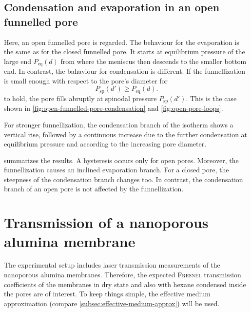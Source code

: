 \documentclass[../thesis.tex]{subfiles}
\begin{document}
      \subsection{Condensation and evaporation in an open funnelled pore}
      \label{subsec:open-funnelled-pore-theory}

        Here, an open funnelled pore is regarded. The behaviour for the evaporation is the same as for the closed funnelled pore. It starts at equilibrium pressure of the large end $P_\mathrm{eq}(d)$ from where the meniscus then descends to the smaller bottom end. In contrast, the bahaviour for condensation is different. If the funnellization is small enough with respect to the pore's diameter for
        \begin{equation*}
            P_\mathrm{sp}(d')\ge P_\mathrm{eq}(d).
            \label{eq:open-fun-pore-precond}
        \end{equation*}
        to hold, the pore fills abruptly at spinodal pressure $P_\mathrm{sp}(d')$. This is the case shown in \cref{fig:open-funnelled-pore-condensation} and \cref{fig:open-pore-loops}.

        For stronger funnellization, the condensation branch of the isotherm shows a vertical rise, followed by a continuous increase due to the further condensation at equilibrium pressure and according to the increasing pore diameter.
        \medskip

         summarizes the results. A hysteresis occurs only for open pores. Moreover, the funnellization causes an inclined evaporation branch. For a closed pore, the steepness of the condensation branch changes too. In contrast, the condensation branch of an open pore is not affected by the funnellization.

        


    \section{Transmission of a nanoporous alumina membrane}

      The experimental setup includes laser transmission measurements of the nanoporous alumina membranes. Therefore, the expected \textsc{Fresnel} transmission coefficients of the membranes in dry state and also with hexane condensed inside the pores are of interest. To keep things simple, the effective medium approximation (compare \cref{subsec:effective-medium-approx}) will be used.
\end{document}
